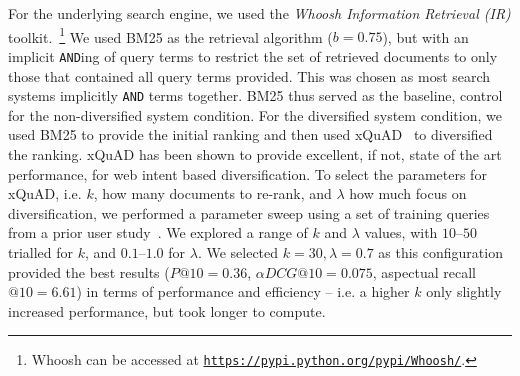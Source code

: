 
For the underlying search engine, we used the \emph{Whoosh Information Retrieval (IR)} toolkit.~\footnote{Whoosh can be accessed at \texttt{\url{https://pypi.python.org/pypi/Whoosh/}}.} We used BM25 as the retrieval algorithm ($b=0.75$), but with an implicit \texttt{AND}ing of query terms to restrict the set of retrieved documents to only those that contained all query terms provided. This was chosen as most search systems implicitly \texttt{AND} terms together. BM25 thus served as the baseline, control for the non-diversified system condition. For the diversified system condition, we used BM25 to provide the initial ranking and then used xQuAD~\cite{santos2010query_reformulations_diversification} to diversified the ranking. xQuAD has been shown to provide excellent, if not, state of the art performance, for web intent based diversification. To select the parameters for xQuAD, i.e. $k$, how many documents to re-rank, and $\lambda$ how much focus on diversification, we performed a parameter sweep using a set of training queries from a prior user study~\cite{maxwell2017snippet_length}. We explored a range of $k$ and $\lambda$ values, with $10$--$50$ trialled for $k$, and $0.1$--$1.0$ for $\lambda$. We selected $k=30, \lambda=0.7$ as this configuration provided the best results ($P@10=0.36$, $\alpha DCG@10=0.075$, aspectual recall$@10=6.61$) in terms of performance and efficiency -- i.e. a higher $k$ only slightly increased performance, but took longer to compute.

